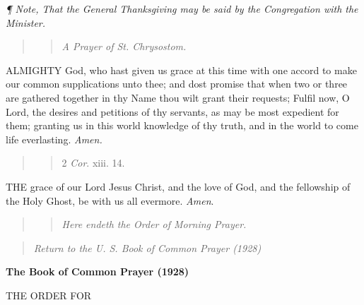 \emph{¶
Note, That the General Thanksgiving may be said by the Congregation with
the Minister.}

\begin{quote}

\begin{quote}

\emph{A
Prayer of St. Chrysostom.}

\end{quote}

\end{quote}

ALMIGHTY
God, who hast given us grace at this time with one accord to make our
common supplications unto thee; and dost promise that when two or three
are gathered together in thy Name thou wilt grant their requests; Fulfil
now, O Lord, the desires and petitions of thy servants, as may be most
expedient for them; granting us in this world knowledge of thy truth,
and in the world to come life everlasting. \emph{Amen.}

\begin{quote}

\begin{quote}

2
\emph{Cor}. xiii. 14.

\end{quote}

\end{quote}

THE
grace of our Lord Jesus Christ, and the love of God, and the fellowship
of the Holy Ghost, be with us all evermore. \emph{Amen}.

\begin{quote}

\begin{quote}

\emph{Here
endeth the Order of Morning Prayer.}

\end{quote}

\end{quote}

\begin{quote}

\emph{Return to the U.
S. Book of Common Prayer (1928)}

\end{quote}


\textbf{The Book of Common Prayer (1928)}

THE ORDER FOR

